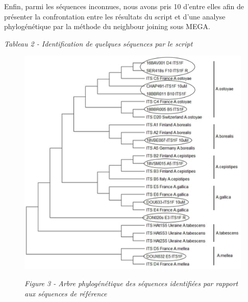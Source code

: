 Enfin, parmi les séquences inconnues, nous avons pris 10 d'entre elles afin de présenter la confrontation entre les résultats du script et d'une analyse phylogénétique par la méthode du neighbour joining \cite{Saitou1987} sous MEGA.

\begin{flushright}
\textit{Tableau 2 - Identification de quelques séquences par le script}
\end{flushright}

\begin{figure}
\centering
\includegraphics[scale=0.4]{figures/tree_snippet}
\begin{flushright}
\textit{Figure 3 - Arbre phylogénétique des séquences identifiées par rapport aux séquences de référence}
\end{flushright}
\end{figure}

